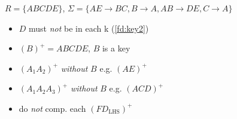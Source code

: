 \begin{minipage}{0.47\linewidth}
$R=\{ABCDE\}$, $\Sigma=\{AE\rightarrow BC, B\rightarrow A, AB\rightarrow DE, C\rightarrow A\}$
\begin{itemize}
\item $D$ must \emph{not} be in each k (\ref{fd:key2})
\item  $(B)^{+} = ABCDE$, $B$ is a key
\item  $(A_{1}A_{2})^{+}$ \emph{without} $B$ e.g. $(AE)^{+}$
\item  $(A_{1}A_{2}A_{3})^{+}$ \emph{without} $B$ e.g. $(ACD)^{+}$
\item do \emph{not} comp. each $(FD_{\text{LHS}})^{+}$
\end{itemize}
\end{minipage}
